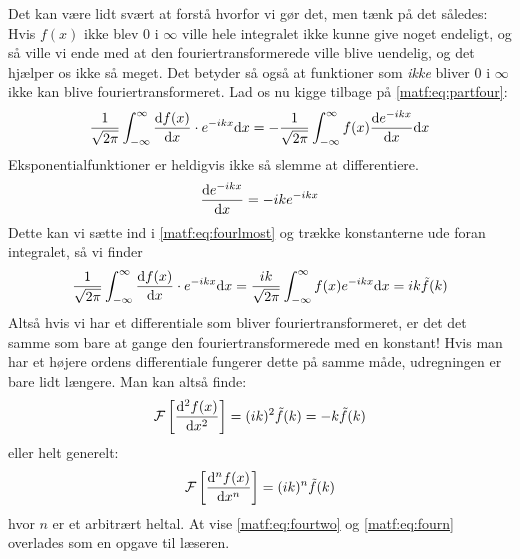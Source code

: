 \documentclass[crop=false, class=memoir]{standalone}
\begin{document}
Det kan være lidt svært at forstå hvorfor vi gør det, men tænk på det således: Hvis $f(x)$ ikke blev $0$ i $\infty$ ville hele integralet ikke kunne give noget endeligt, og så ville vi ende med at den fouriertransformerede ville blive uendelig, og det hjælper os ikke så meget. Det betyder så også at funktioner som \emph{ikke} bliver $0$ i $\infty$ ikke kan blive fouriertransformeret. Lad os nu kigge tilbage på \cref{matf:eq:partfour}:
\begin{align}
    \frac{1}{\sqrt{2\pi}} \int_{-\infty}^{\infty} \dv{f(x)}{x}\cdot e^{-ik x} \dd x = - \frac{1}{\sqrt{2\pi}}\int_{-\infty}^{\infty}f(x) \dv{e^{-ik x}}{x} \dd x
    \label{matf:eq:fourlmost}
\end{align}
Eksponentialfunktioner er heldigvis ikke så slemme at differentiere.
\begin{align}
    \dv{e^{-ik x}}{x} = -ik e^{-ik x}
\end{align}
Dette kan vi sætte ind i \cref{matf:eq:fourlmost} og trække konstanterne ude foran integralet, så vi finder
\begin{align}
    \frac{1}{\sqrt{2\pi}} \int_{-\infty}^{\infty} \dv{f(x)}{x}\cdot e^{-ik x} \dd x =  \frac{ik}{\sqrt{2\pi}}\int_{-\infty}^{\infty}f(x) e^{-ik x} \dd x = ik \Tilde{f}(k)
\end{align}
Altså hvis vi har et differentiale som bliver fouriertransformeret, er det det samme som bare at gange den fouriertransformerede med en konstant! Hvis man har et højere ordens differentiale fungerer dette på samme måde, udregningen er bare lidt længere. Man kan altså finde:
\begin{align}
    \mathcal{F}\left[ \dv[2]{f(x)}{x} \right] = (ik)^2 \Tilde{f}(k) = -k\Tilde{f}(k)
    \label{matf:eq:fourtwo}
\end{align}
eller helt generelt:
\begin{align}
    \mathcal{F}\left[ \dv[n]{f(x)}{x} \right] = (ik)^n \Tilde{f}(k)
    \label{matf:eq:fourn}
\end{align}
hvor $n$ er et arbitrært heltal. At vise \cref{matf:eq:fourtwo} og \cref{matf:eq:fourn} overlades som en opgave til læseren.
\end{document}
